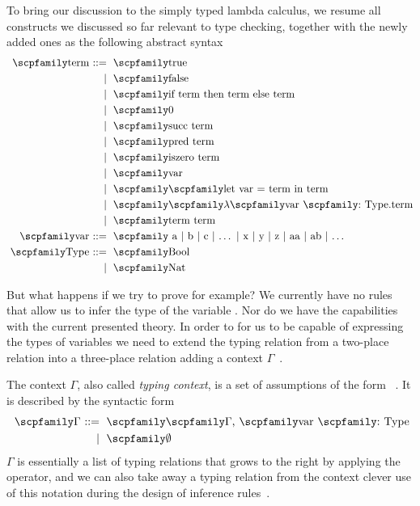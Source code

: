 \documentclass[
  oneside,
  english,
  coorientadorbanca,
  noabntexcite
]{ufsc-thesis-rn46-2019}
\def\bnfdef{::=}
\newcommand{\codett}[1]{\text{\scpfamily#1}}
\newcommand{\code}[1]{\text{\scpfamily\setlength\spaceskip{0.35em}#1}}
\newcommand{\bnfvar}[1]{\codett{#1}}
\newcommand{\bnfmore}[1]{            & \ & \mid{}    & \ \code{#1}}
\newcommand{\astprod}[2]{\code{#1} & \ & \bnfdef{} & \ \code{#2}}
\newcommand{\astmore}[1]{\bnfmore{#1}}
\newcommand{\typer}[2]{\code{#1 \codett{:} #2}}
\newcommand{\fnabs}[3]{\code{$\lambda$\typer{#1}{#2}.#3}}
\newcommand{\astlet}[3]{\code{let #1 = #2 in #3}}
\begin{document}
To bring our discussion to the simply typed lambda calculus, we resume all constructs we discussed so far relevant to type checking, together with the newly added ones as the following abstract syntax
\begin{equation}~\label{eq:simply_typed_lc}
  \begin{alignedat}{2}
    \astprod{term}{true} \\
    \astmore{false} \\
    \astmore{if term then term else term} \\
    \astmore{0} \\
    \astmore{succ term} \\
    \astmore{pred term} \\
    \astmore{iszero term} \\
    \astmore{var} \\
    \astmore{\astlet{var}{term}{term}} \\
    \astmore{\fnabs{var}{Type}{term}} \\
    \astmore{term term} \\
    \astprod{var}{ a $\mid$ b $\mid$ c $\mid$ $\dots$ $\mid$ x $\mid$ y $\mid$ z $\mid$ aa $\mid$ ab $\mid$ $\dots$} \\
    \astprod{Type}{Bool} \\
    \astmore{Nat}
  \end{alignedat}
\end{equation}

But what happens if we try to prove \typer{succ a}{Nat} for example?
We currently have no rules that allow us to infer the type of the variable \codett{a}.
Nor do we have the capabilities with the current presented theory.
In order to for us to be capable of expressing the types of variables we need to extend the typing relation from a two-place relation into a three-place relation adding a context $\Gamma$~\cite{pierce2002types}.

The context $\Gamma$, also called \textit{typing context}, is a set of assumptions of the form \typer{var}{Type}~\cite{pierce2002types}.
It is described by the syntactic form
\begin{equation}~\label{eq:sample_term_ast_bool_g}
  \begin{alignedat}{2}
    \astprod{$\Gamma$}{\bnfvar{$\Gamma$}, \typer{var}{Type}} \\
    \bnfmore{$\emptyset$}
  \end{alignedat}
\end{equation}
$\Gamma$ is essentially a list of typing relations that grows to the right by applying the \code{,} operator, and we can also take away a typing relation from the context clever use of this notation during the design of inference rules~\cite{pierce2002types}.
\end{document}
